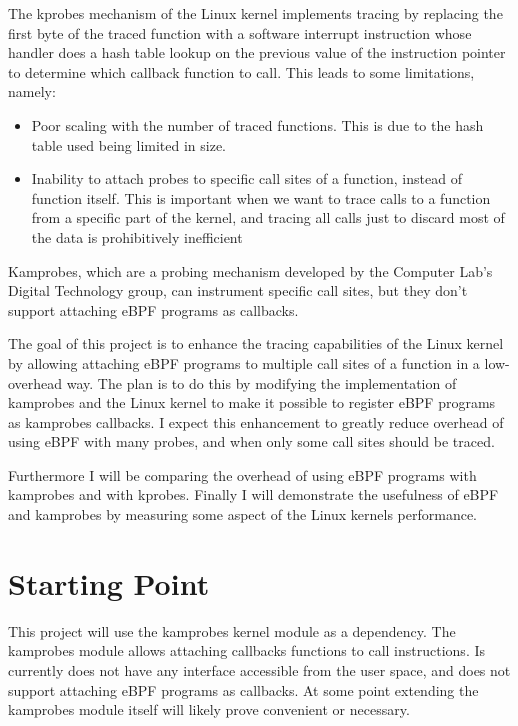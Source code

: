     The kprobes mechanism of the Linux kernel implements tracing by replacing the first byte of the 
    traced function with a software interrupt instruction whose handler does a hash table lookup on the 
    previous value of the instruction pointer to determine which callback function to call.
    This leads to some limitations, namely:

    \vspace{-0.60em}
    \begin{itemize}
        \setlength{\itemsep}{-0.3em}
        \item Poor scaling with the number of traced functions. This is due to the hash table used being limited in size.
        \item Inability to attach probes to specific call sites of a function, instead of function itself. 
        This is important when we want to trace calls to a function from a specific part of the kernel,
        and tracing all calls just to discard most of the data is prohibitively inefficient
    \end{itemize}

    Kamprobes, which are a probing mechanism developed by the Computer Lab's Digital Technology group, can instrument 
    specific call sites, but they don't support attaching eBPF programs as callbacks.

    The goal of this project is to enhance the tracing capabilities of the Linux kernel by allowing attaching eBPF programs
    to multiple call sites of a function in a low-overhead way. The plan is to do this by modifying the implementation of
    kamprobes and the Linux kernel to make it possible to register eBPF programs as kamprobes callbacks.
    I expect this enhancement to greatly reduce overhead of using eBPF with many probes, and when only some call sites
    should be traced.

    Furthermore I will be comparing the overhead of using eBPF programs with kamprobes and with kprobes. 
    Finally I will demonstrate the usefulness of eBPF and kamprobes by measuring some aspect of the Linux kernels
    performance.
 
\section*{Starting Point}

    This project will use the kamprobes kernel module as a dependency.
    The kamprobes module allows attaching callbacks functions to call instructions.
    Is currently does not have any interface accessible from the user space, and does not support
    attaching eBPF programs as callbacks.
    At some point extending the kamprobes module itself will likely prove convenient or necessary.


